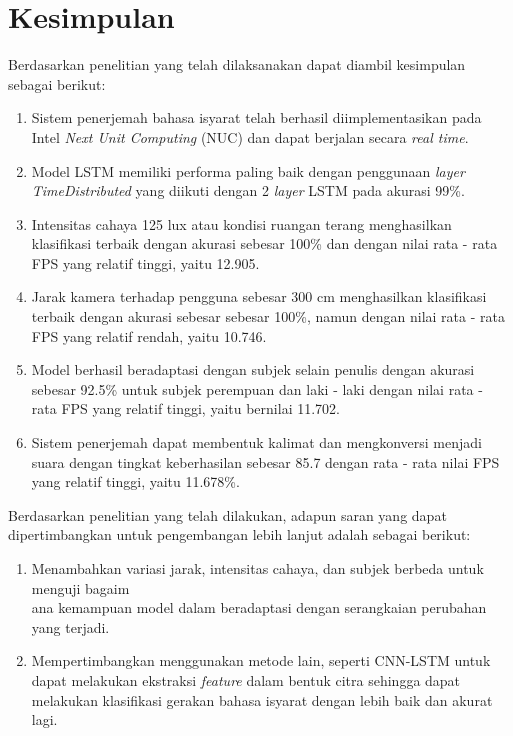 \section{Kesimpulan}
\label{sec:kesimpulan}


Berdasarkan penelitian yang telah dilaksanakan dapat diambil kesimpulan sebagai berikut:

\begin{enumerate}[nolistsep]
      \item Sistem penerjemah bahasa isyarat telah berhasil diimplementasikan pada Intel \emph{Next Unit Computing} (NUC) dan dapat berjalan secara \emph{real time}. 
  \item Model LSTM memiliki performa paling baik dengan penggunaan \emph{layer TimeDistributed} yang diikuti dengan 2 \emph{layer} LSTM pada akurasi 99\%.
  \item Intensitas cahaya 125 lux atau kondisi ruangan terang menghasilkan klasifikasi terbaik dengan akurasi sebesar 100\% dan dengan nilai rata - rata FPS yang relatif tinggi, yaitu 12.905.
  \item Jarak kamera terhadap pengguna sebesar 300 cm menghasilkan klasifikasi terbaik dengan akurasi sebesar sebesar 100\%, namun dengan nilai rata - rata FPS yang relatif rendah, yaitu 10.746.
  \item Model berhasil beradaptasi dengan subjek selain penulis dengan akurasi sebesar 92.5\% untuk subjek perempuan dan laki - laki dengan nilai rata - rata FPS yang relatif tinggi, yaitu bernilai 11.702.
  \item Sistem penerjemah dapat membentuk kalimat dan mengkonversi menjadi suara dengan tingkat keberhasilan sebesar 85.7 dengan rata - rata nilai FPS yang relatif tinggi, yaitu 11.678\%.
  
\end{enumerate}

Berdasarkan penelitian yang telah dilakukan, adapun saran yang dapat dipertimbangkan untuk pengembangan lebih lanjut adalah sebagai berikut:

\begin{enumerate}[nolistsep]

  \item Menambahkan variasi jarak, intensitas cahaya, dan subjek berbeda untuk menguji bagaim\\ana kemampuan model dalam beradaptasi dengan serangkaian perubahan yang terjadi.
  \item Mempertimbangkan menggunakan metode lain, seperti CNN-LSTM untuk dapat melakukan ekstraksi \emph{feature} dalam bentuk citra sehingga dapat melakukan klasifikasi gerakan bahasa isyarat dengan lebih baik dan akurat lagi.

\end{enumerate}